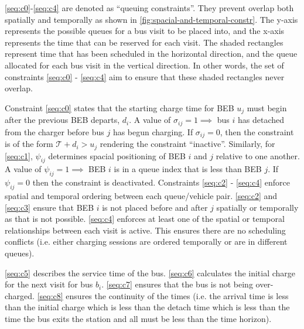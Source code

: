 \documentclass[ee,thesis]{usuthesis}
\newcommand{\T}{\mathcal{T}}                %
\begin{document}
\ref{seq:c0}-\ref{seq:c4} are denoted as ``queuing constraints''. They prevent overlap both spatially and temporally as
shown in \ref{fig:spacial-and-temporal-constr}. The y-axis represents the possible queues for a bus visit to be placed into, and the x-axis
represents the time that can be reserved for each visit. The shaded rectangles represent time that has been scheduled in
the horizontal direction, and the queue allocated for each bus visit in the vertical direction. In other words, the set
of constraints \ref{seq:c0} - \ref{seq:c4} aim to ensure that these shaded rectangles never overlap.

Constraint \ref{seq:c0} states that the starting charge time for BEB \(u_j\) must begin after the previous BEB departs,
\(d_i\). A value of \(\sigma_{ij} = 1 \implies\) bus \(i\) has detached from the charger before bus \(j\) has begun charging. If
\(\sigma_{ij} = 0\), then the constraint is of the form \(\T + d_i > u_j\) rendering the constraint ``inactive''. Similarly, for
\ref{seq:c1}, \(\psi_{ij}\) determines spacial positioning of BEB \(i\) and \(j\) relative to one another. A value of \(\psi_{ij} = 1
\implies\) BEB \(i\) is in a queue index that is less than BEB \(j\). If \(\psi_{ij} = 0\) then the constraint is deactivated.
Constraints \ref{seq:c2} - \ref{seq:c4} enforce spatial and temporal ordering between each queue/vehicle pair.
\ref{seq:c2} and \ref{seq:c3} ensure that BEB \(i\) is not placed before and after \(j\) spatially or temporally as that is
not possible. \ref{seq:c4} enforces at least one of the spatial or temporal relationships between each visit is active.
This ensures there are no scheduling conflicts (i.e. either charging sessions are ordered temporally or are in different
queues).

\ref{seq:c5} describes the service time of the bus. \ref{seq:c6} calculates the initial charge for the next visit for
bus \(b_i\). \ref{seq:c7} ensures that the bus is not being over-charged. \ref{seq:c8} ensures the continuity of the times
(i.e. the arrival time is less than the initial charge which is less than the detach time which is less than the time
the bus exits the station and all must be less than the time horizon).
\end{document}
